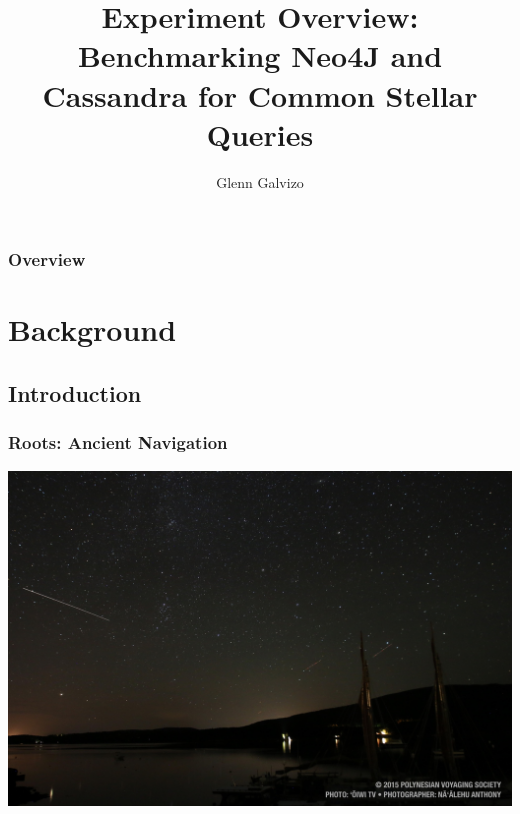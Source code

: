 \documentclass[11pt]{beamer}
\author{Glenn Galvizo}
\title{Experiment Overview: Benchmarking Neo4J and Cassandra for Common Stellar Queries}
\institute{University of Hawaii at Manoa \\ ICS 421}
\begin{document}
    \begin{frame}
        \titlepage
    \end{frame}

    \begin{frame}
        \frametitle{Overview}
        \tableofcontents
    \end{frame}

    \section{Background}\label{sec:background}
    \subsection{Introduction}\label{subsec:introduction}
    \begin{frame}
        \frametitle{Roots: Ancient Navigation}
        \centerline{\includegraphics[scale=0.18]{images/hokulea.jpg}}
    \end{frame}
\end{document}

